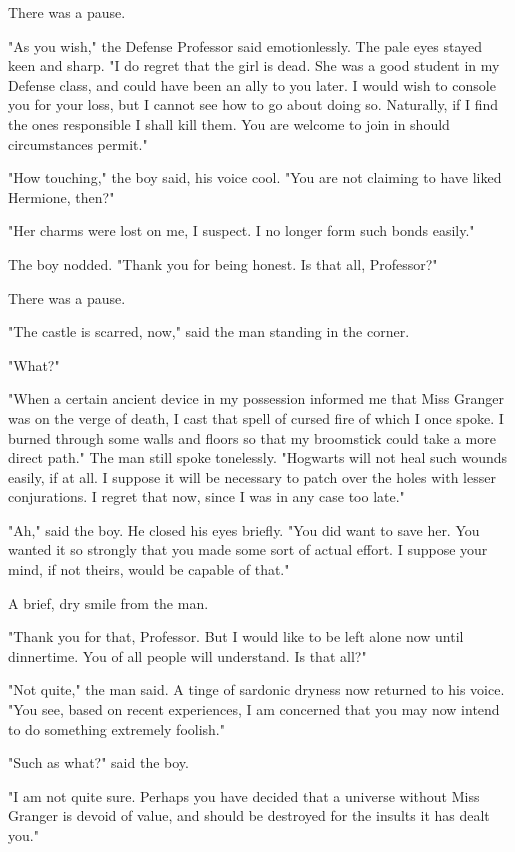 There was a pause.

"As you wish," the Defense Professor said emotionlessly. The pale eyes stayed
keen and sharp. "I do regret that the girl is dead. She was a good student in
my Defense class, and could have been an ally to you later. I would wish to
console you for your loss, but I cannot see how to go about doing so.
Naturally, if I find the ones responsible I shall kill them. You are welcome to
join in should circumstances permit."

"How touching," the boy said, his voice cool. "You are not claiming to have
liked Hermione, then?"

"Her charms were lost on me, I suspect. I no longer form such bonds easily."

The boy nodded. "Thank you for being honest. Is that all, Professor?"

There was a pause.

"The castle is scarred, now," said the man standing in the corner.

"What?"

"When a certain ancient device in my possession informed me that Miss Granger
was on the verge of death, I cast that spell of cursed fire of which I once
spoke. I burned through some walls and floors so that my broomstick could take
a more direct path." The man still spoke tonelessly. "Hogwarts will not heal
such wounds easily, if at all. I suppose it will be necessary to patch over the
holes with lesser conjurations. I regret that now, since I was in any case too
late."

"Ah," said the boy. He closed his eyes briefly. "You did want to save her. You
wanted it so strongly that you made some sort of actual effort. I suppose your
mind, if not theirs, would be capable of that."

A brief, dry smile from the man.

"Thank you for that, Professor. But I would like to be left alone now until
dinnertime. You of all people will understand. Is that all?"

"Not quite," the man said. A tinge of sardonic dryness now returned to his
voice. "You see, based on recent experiences, I am concerned that you may now
intend to do something extremely foolish."

"Such as what?" said the boy.

"I am not quite sure. Perhaps you have decided that a universe without Miss
Granger is devoid of value, and should be destroyed for the insults it has
dealt you."

